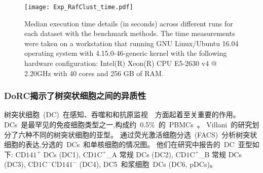     \begin{figure}[!htbp]
        \centering
        \texttt{[image: Exp\_RafClust\_time.pdf]}
        \caption{Median execution time details (in seconds) across  different runs for each dataset with the benchmark methods. 
        The time measurements were taken on a workstation that running GNU Linux/Ubuntu 16.04 operating system with 4.15.0-46-generic kernel with the
        following hardware configuration: Intel(R) Xeon(R) CPU E5-2630 v4 @ 2.20GHz with 40 cores and 256 GB of RAM.}
        \label{supp-fig:clusteringtime}
    \end{figure}

\subsubsection{DoRC揭示了树突状细胞之间的异质性}
树突状细胞~(DC)~在感知、吞噬和和抗原监视~\cite{villani2017single}~方面起着至关重要的作用。
DCs~是最罕见的免疫细胞类型之一,构成约~0.5\%~的~PBMCs~\cite{zheng2017massively}。
Villani~\cite{villani2017single}的研究划分了六种不同的树突状细胞的亚型。
通过荧光激活细胞分选~(FACS)~分析树突状细胞的表达,分选的~DCs~和单核细胞的情况图。
他们在研究中报告的~DC~亚型如下:
$\text{CD141}^+$ DCs (DC1), 
$\text{CD1C}^+${\_}A 常规 DCs (DC2),
$\text{CD1C}^+${\_}B 常规 DCs (DC3),
$\text{CD1C}^-\text{CD141}^-$ (DC4), DC5~和浆细胞~DCs (DC6, pDCs)。


